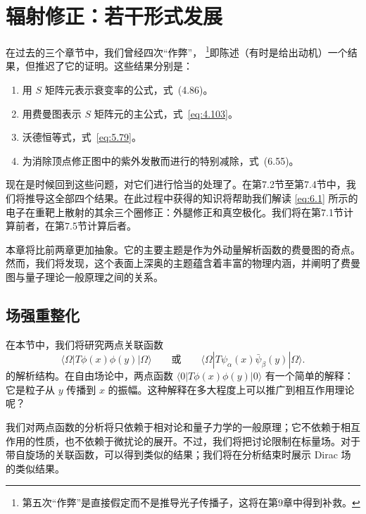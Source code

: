 \chapter{辐射修正：若干形式发展}

在过去的三个章节中，我们曾经四次“作弊”，%
\footnote{第五次“作弊”是直接假定而不是推导光子传播子，这将在第9章中得到补救。}即陈述（有时是给出动机）一个结果，但推迟了它的证明。这些结果分别是：
\begin{enumerate}
  \item 用 $S$ 矩阵元表示衰变率的公式，式~(4.86)。
  \item 用费曼图表示 $S$ 矩阵元的主公式，式~\eqref{eq:4.103}。
  \item 沃德恒等式，式~\eqref{eq:5.79}。
  \item 为消除顶点修正图中的紫外发散而进行的特别减除，式~(6.55)。
\end{enumerate}
现在是时候回到这些问题，对它们进行恰当的处理了。在第7.2节至第7.4节中，我们将推导这全部四个结果。在此过程中获得的知识将帮助我们解读 \eqref{eq:6.1} 所示的电子在重靶上散射的其余三个圈修正：外腿修正和真空极化。我们将在第7.1节计算前者，在第7.5节计算后者。

本章将比前两章更加抽象。它的主要主题是作为外动量解析函数的费曼图的奇点。然而，我们将发现，这个表面上深奥的主题蕴含着丰富的物理内涵，并阐明了费曼图与量子理论一般原理之间的关系。

\section{场强重整化}

在本节中，我们将研究两点关联函数
\begin{equation}
  \langle\Omega|T\phi(x)\phi(y)|\Omega\rangle
  \qquad\text{或}\qquad
  \langle\Omega|T\psi_\alpha(x)\bar{\psi}_\beta(y)|\Omega\rangle .
\end{equation}
的解析结构。在自由场论中，两点函数
$\langle 0|T\phi(x)\phi(y)|0\rangle$ 有一个简单的解释：它是粒子从 $y$ 传播到 $x$ 的振幅。这种解释在多大程度上可以推广到相互作用理论呢？

我们对两点函数的分析将只依赖于相对论和量子力学的一般原理；它不依赖于相互作用的性质，也不依赖于微扰论的展开。不过，我们将把讨论限制在标量场。对于带自旋场的关联函数，可以得到类似的结果；我们将在分析结束时展示 Dirac 场的类似结果。

